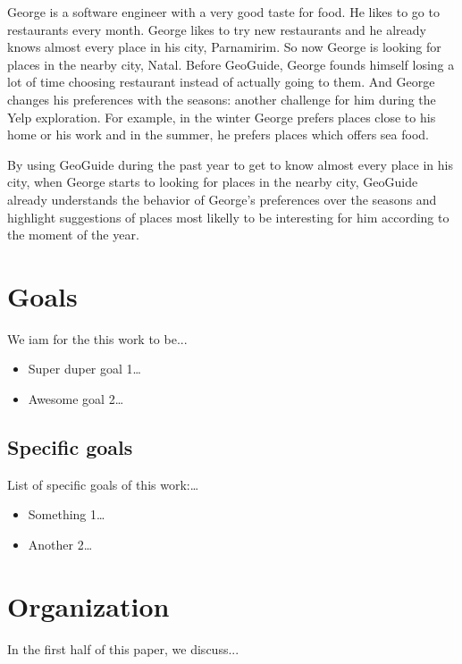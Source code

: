 George is a software engineer with a very good taste for food. He likes to go to restaurants every month. George likes to try new restaurants and he already knows almost every place in his city, Parnamirim. So now George is looking for places in the nearby city, Natal. Before GeoGuide, George founds himself losing a lot of time choosing restaurant instead of actually going to them. And George changes his preferences with the seasons: another challenge for him during the Yelp exploration. For example, in the winter George prefers places close to his home or his work and in the summer, he prefers places which offers sea food.

By using GeoGuide during the past year to get to know almost every place in his city, when George starts to looking for places in the nearby city, GeoGuide already understands the behavior of George's preferences over the seasons and highlight suggestions of places most likelly to be interesting for him according to the moment of the year.

\section{Goals}

We iam for the this work to be...

\begin{itemize}
	\item Super duper goal 1\ldots
	\item Awesome goal 2\ldots
\end{itemize}

\subsection{Specific goals}

List of specific goals of this work:\ldots

\begin{itemize}
	\item Something 1\ldots
	\item Another 2\ldots
\end{itemize}

\section{Organization}

In the first half of this paper, we discuss...
